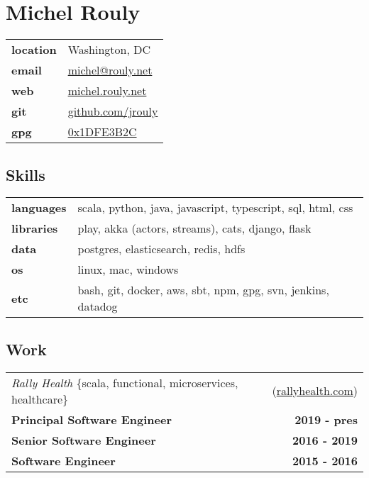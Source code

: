 \documentclass[10pt,letterpaper]{article}
\begin{document}
\setcounter{secnumdepth}{0}

\section{Michel Rouly}


\begin{tabularx}{\textwidth}{@{}lX@{}}
  \textbf{location} & Washington, DC \\
  \textbf{email} & \href{mailto:michel@rouly.net}{michel@rouly.net} \\
  \textbf{web} & \href{https://michel.rouly.net}{michel.rouly.net} \\
  \textbf{git} & \href{https://github.com/jrouly}{github.com/jrouly} \\
  \textbf{gpg} & \href{http://keys.gnupg.net/pks/lookup?op=get\&search=0x68E925EE1DFE3B2C}{0x1DFE3B2C}
\end{tabularx}


\subsection{Skills}

\noindent
\begin{tabularx}{\textwidth}{@{}lX@{}}
  \textbf{languages} & scala, python, java, javascript, typescript, sql, html, css \\
  \textbf{libraries} & play, akka (actors, streams), cats, django, flask \\
  \textbf{data} & postgres, elasticsearch, redis, hdfs \\
  \textbf{os} & linux, mac, windows \\
  \textbf{etc} & bash, git, docker, aws, sbt, npm, gpg, svn, jenkins, datadog
\end{tabularx}


\subsection{Work}


\noindent\begin{tabularx}{\textwidth}{@{}X r@{}}
  \textit{Rally Health} \{scala, functional, microservices, healthcare\} & (\href{https://rallyhealth.com}{rallyhealth.com}) \\
  \textbf{Principal Software Engineer} & \textbf{2019 - pres} \\
  \textbf{Senior Software Engineer} & \textbf{2016 - 2019} \\
  \textbf{Software Engineer} & \textbf{2015 - 2016} \\
\end{tabularx}
\end{document}
